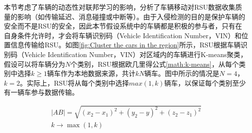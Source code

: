 本节考虑了车辆的动态性对联邦学习的影响，分析了车辆移动对RSU数据收集质量的影响（如传输延迟、消息碰撞或中断等）。由于入侵检测的目的是保护车辆的安全而不是RSU的安全，因此本节假设系统中的车辆都是积极的参与者，只有在自身条件允许时，才会将车辆识别码（Vehicle Identification Number，VIN）和位置信息传输给RSU。如图\ref{fig:Cluster the cars in the region}所示，RSU根据车辆识别码（Vehicle Identification Number，VIN）对区域内的车辆进行K-means聚类，假设可以将车辆分为$N$个类别，RSU根据欧几里得公式\ref{math:k-means}，从每个类别中选择$k \geq 1$辆车作为本地数据来源，共计$kN$辆车。图中所示的情况是$N=4$，$k=2$。实际上，RSU将从每个类别中选择$max(1,k)$辆车，以保证每个类别至少有一辆车参与数据传输。

\begin{equation}
\begin{array}{l}
|AB|=\sqrt{(x_2-x_1)^2+(y_2-y)^2+(z_2-z_1)^2}\\
k\to\max(1,k)
\end{array}
\label{math:k-means}
\end{equation}




